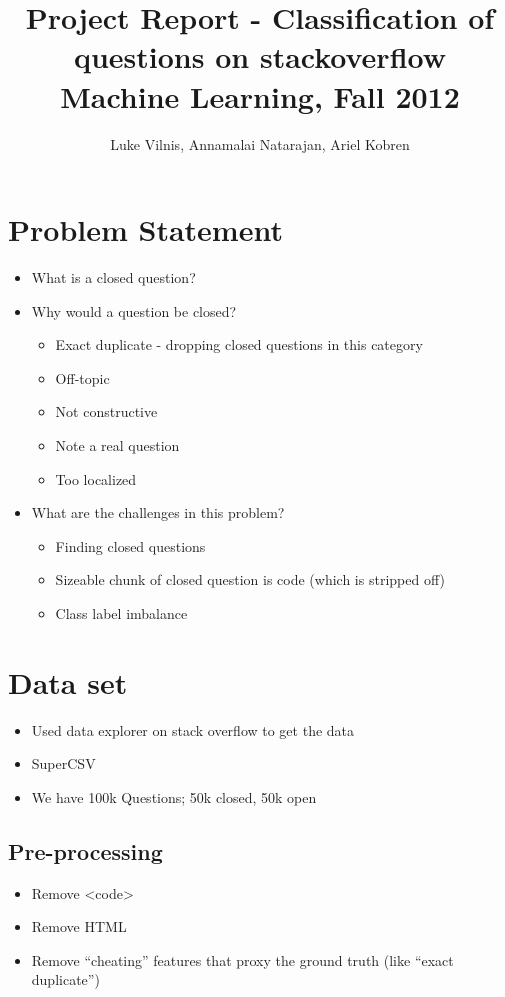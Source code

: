 \documentclass[11pt]{article}
\title{Project Report - Classification of questions on stackoverflow\\ Machine Learning, Fall 2012}
\author{Luke Vilnis, Annamalai Natarajan, Ariel Kobren}
\begin{document}
\sloppy

\maketitle
\tableofcontents
\pagebreak

\section{Problem Statement}
\begin{itemize}
\item What is a closed question?
\item Why would a question be closed?
	\begin{itemize}
	\item Exact duplicate - dropping closed questions in this category
	\item Off-topic
	\item Not constructive
	\item Note a real question
	\item Too localized
	\end{itemize}
\item What are the challenges in this problem?
	\begin{itemize}
	\item Finding closed questions
	\item Sizeable chunk of closed question is code (which is stripped off)
	\item Class label imbalance
	\end{itemize}
\end{itemize}

\section{Data set}
\begin{itemize}
\item Used data explorer on stack overflow to get the data
\item SuperCSV
\item We have 100k Questions; 50k closed, 50k open
\end{itemize}

\subsection{Pre-processing}
\begin{itemize}
\item Remove <code>
\item Remove HTML
\item Remove “cheating” features that proxy the ground truth (like “exact duplicate”)
\end{itemize}
\end{document}

